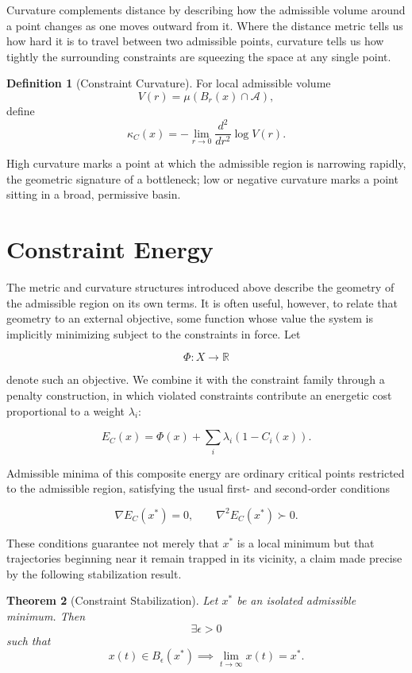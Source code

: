 \documentclass[11pt,oneside]{book}
\theoremstyle{plain}
\newtheorem{theorem}{Theorem}[chapter]
\theoremstyle{definition}
\newtheorem{definition}[theorem]{Definition}
\theoremstyle{remark}
\begin{document}
Curvature complements distance by describing how the admissible volume around a point changes as one moves outward from it. Where the distance metric tells us how hard it is to travel between two admissible points, curvature tells us how tightly the surrounding constraints are squeezing the space at any single point.

\begin{definition}[Constraint Curvature]
For local admissible volume
\[
V(r)
=
\mu(B_r(x)\cap\mathcal A),
\]
define
\[
\kappa_C(x)
=
-
\lim_{r\to0}
\frac{d^2}{dr^2}
\log V(r).
\]
\end{definition}

High curvature marks a point at which the admissible region is narrowing rapidly, the geometric signature of a bottleneck; low or negative curvature marks a point sitting in a broad, permissive basin.

\section{Constraint Energy}

The metric and curvature structures introduced above describe the geometry of the admissible region on its own terms. It is often useful, however, to relate that geometry to an external objective, some function whose value the system is implicitly minimizing subject to the constraints in force. Let

\[
\Phi:X\to\mathbb R
\]

denote such an objective. We combine it with the constraint family through a penalty construction, in which violated constraints contribute an energetic cost proportional to a weight \(\lambda_i\):

\[
E_C(x)
=
\Phi(x)
+
\sum_i
\lambda_i(1-C_i(x)).
\]

Admissible minima of this composite energy are ordinary critical points restricted to the admissible region, satisfying the usual first- and second-order conditions

\[
\nabla E_C(x^\ast)=0,
\qquad
\nabla^2E_C(x^\ast)\succ0.
\]

These conditions guarantee not merely that \(x^\ast\) is a local minimum but that trajectories beginning near it remain trapped in its vicinity, a claim made precise by the following stabilization result.

\begin{theorem}[Constraint Stabilization]
Let
\(x^\ast\) be an isolated admissible minimum.
Then
\[
\exists\epsilon>0
\]
such that
\[
x(t)\in B_\epsilon(x^\ast)
\implies
\lim_{t\to\infty}x(t)=x^\ast.
\]
\end{theorem}
\end{document}
